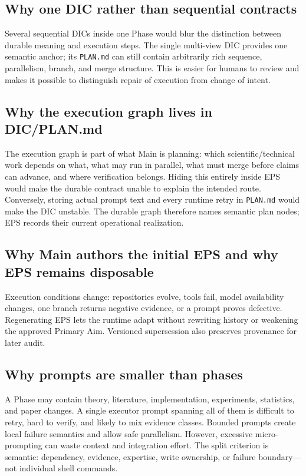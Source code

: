 \documentclass[11pt,a4paper]{article}
\begin{document}
\subsection{Why one DIC rather than sequential contracts}
Several sequential DICs inside one Phase would blur the distinction between durable meaning and execution steps. The single multi-view DIC provides one semantic anchor; its \texttt{PLAN.md} can still contain arbitrarily rich sequence, parallelism, branch, and merge structure. This is easier for humans to review and makes it possible to distinguish repair of execution from change of intent.

\subsection{Why the execution graph lives in DIC/PLAN.md}
The execution graph is part of what Main is planning: which scientific/technical work depends on what, what may run in parallel, what must merge before claims can advance, and where verification belongs. Hiding this entirely inside EPS would make the durable contract unable to explain the intended route. Conversely, storing actual prompt text and every runtime retry in \texttt{PLAN.md} would make the DIC unstable. The durable graph therefore names semantic plan nodes; EPS records their current operational realization.

\subsection{Why Main authors the initial EPS and why EPS remains disposable}
Execution conditions change: repositories evolve, tools fail, model availability changes, one branch returns negative evidence, or a prompt proves defective. Regenerating EPS lets the runtime adapt without rewriting history or weakening the approved Primary Aim. Versioned supersession also preserves provenance for later audit.

\subsection{Why prompts are smaller than phases}
A Phase may contain theory, literature, implementation, experiments, statistics, and paper changes. A single executor prompt spanning all of them is difficult to retry, hard to verify, and likely to mix evidence classes. Bounded prompts create local failure semantics and allow safe parallelism. However, excessive micro-prompting can waste context and integration effort. The split criterion is semantic: dependency, evidence, expertise, write ownership, or failure boundary---not individual shell commands.
\end{document}
